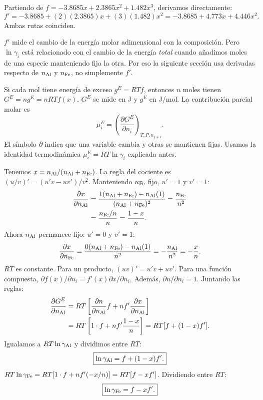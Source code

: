 Partiendo de $f=-3.8685x+2.3865x^2+1.482x^3$, derivamos directamente:
\[
f'=-3.8685+(2)(2.3865)x+(3)(1.482)x^2
=-3.8685+4.773x+4.446x^2.
\]
Ambas rutas coinciden.

$f'$ mide el cambio de la energía molar adimensional con la composición. Pero $\ln\gamma_i$ está relacionado con el cambio de la energía \emph{total} cuando añadimos moles de una especie manteniendo fija la otra. Por eso la siguiente sección usa derivadas respecto de $n_{\mathrm{Al}}$ y $n_{\mathrm{Fe}}$, no simplemente $f'$.


Si cada mol tiene energía de exceso $g^E=RTf$, entonces $n$ moles tienen $G^E=ng^E=nRTf(x)$. $G^E$ se mide en J y $g^E$ en J/mol. La contribución parcial molar es
\[
\mu_i^E=\left(\frac{\partial G^E}{\partial n_i}\right)_{T,P,n_{j\ne i}}.
\]
El símbolo $\partial$ indica que una variable cambia y otras se mantienen fijas. Usamos la identidad termodinámica $\mu_i^E=RT\ln\gamma_i$ explicada antes.

Tenemos $x=n_{\mathrm{Al}}/(n_{\mathrm{Al}}+n_{\mathrm{Fe}})$. La regla del cociente es $(u/v)'=(u'v-uv')/v^2$. Manteniendo $n_{\mathrm{Fe}}$ fijo, $u'=1$ y $v'=1$:
\begin{align*}
\frac{\partial x}{\partial n_{\mathrm{Al}}}
&=\frac{1(n_{\mathrm{Al}}+n_{\mathrm{Fe}})-n_{\mathrm{Al}}(1)}{(n_{\mathrm{Al}}+n_{\mathrm{Fe}})^2}
=\frac{n_{\mathrm{Fe}}}{n^2}\\
&=\frac{n_{\mathrm{Fe}}/n}{n}=\frac{1-x}{n}.
\end{align*}
Ahora $n_{\mathrm{Al}}$ permanece fijo: $u'=0$ y $v'=1$:
\[
\frac{\partial x}{\partial n_{\mathrm{Fe}}}
=\frac{0(n_{\mathrm{Al}}+n_{\mathrm{Fe}})-n_{\mathrm{Al}}(1)}{n^2}
=-\frac{n_{\mathrm{Al}}}{n^2}=-\frac{x}{n}.
\]
$RT$ es constante. Para un producto, $(uv)'=u'v+uv'$. Para una función compuesta, $\partial f(x)/\partial n_i=f'(x)\partial x/\partial n_i$. Además, $\partial n/\partial n_i=1$. Juntando las reglas:
\begin{align*}
\frac{\partial G^E}{\partial n_{\mathrm{Al}}}
&=RT\left[\frac{\partial n}{\partial n_{\mathrm{Al}}}f+n f'\frac{\partial x}{\partial n_{\mathrm{Al}}}\right]\\
&=RT\left[1\cdot f+n f'\frac{1-x}{n}\right]
=RT[f+(1-x)f'].
\end{align*}
Igualamos a $RT\ln\gamma_{\mathrm{Al}}$ y dividimos entre $RT$:
\[
\boxed{\ln\gamma_{\mathrm{Al}}=f+(1-x)f'.}
\]
$RT\ln\gamma_{\mathrm{Fe}}=RT[1\cdot f+n f'(-x/n)]=RT[f-xf']$. Dividiendo entre $RT$:
\[
\boxed{\ln\gamma_{\mathrm{Fe}}=f-xf'.}
\]

